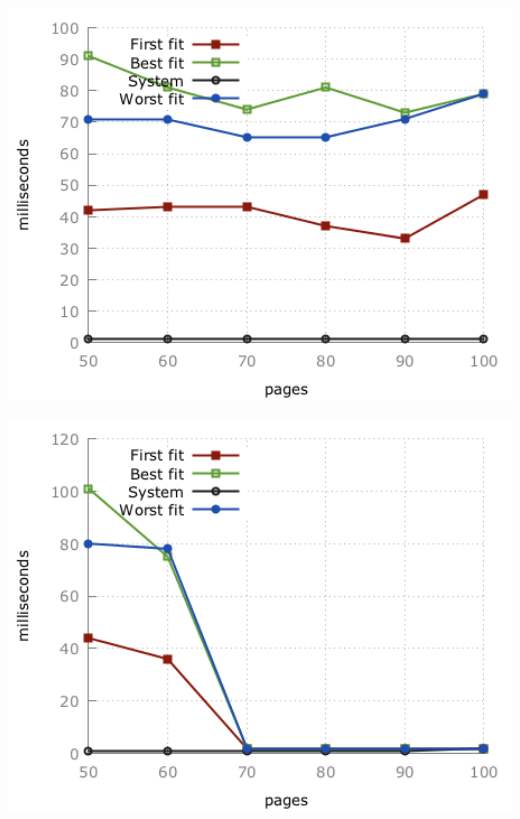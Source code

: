 \documentclass[paper=a4, fontsize=11pt]{scrartcl} %
\numberwithin{equation}{section} %
\numberwithin{figure}{section} %
\numberwithin{table}{section} %
\begin{document}
\begin{minipage}{.3\textwidth}
    \centering
    \includegraphics[width=1\textwidth]{images/time_plot_big1.png}
    \label{fig:big1}
\end{minipage}%
\begin{minipage}{.3\textwidth}
    \centering
    \includegraphics[width=1\textwidth]{images/time_plot_big2.png}
    \label{fig:big2}
\end{minipage}
\end{document}
